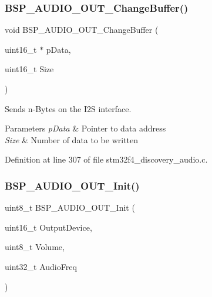 \subsubsection{\texorpdfstring{B\+S\+P\+\_\+\+A\+U\+D\+I\+O\+\_\+\+O\+U\+T\+\_\+\+Change\+Buffer()}{BSP\_AUDIO\_OUT\_ChangeBuffer()}}
{\footnotesize\ttfamily void B\+S\+P\+\_\+\+A\+U\+D\+I\+O\+\_\+\+O\+U\+T\+\_\+\+Change\+Buffer (\begin{DoxyParamCaption}\item[{uint16\+\_\+t $\ast$}]{p\+Data,  }\item[{uint16\+\_\+t}]{Size }\end{DoxyParamCaption})}



Sends n-\/\+Bytes on the I2S interface. 


\begin{DoxyParams}{Parameters}
{\em p\+Data} & Pointer to data address \\
\hline
{\em Size} & Number of data to be written \\
\hline
\end{DoxyParams}


Definition at line 307 of file stm32f4\+\_\+discovery\+\_\+audio.\+c.

\mbox{\label{group___s_t_m32_f4___d_i_s_c_o_v_e_r_y___a_u_d_i_o___o_u_t___exported___functions_gae713c698a93ff492424c6a8363f53bcc}} 
\subsubsection{\texorpdfstring{B\+S\+P\+\_\+\+A\+U\+D\+I\+O\+\_\+\+O\+U\+T\+\_\+\+Init()}{BSP\_AUDIO\_OUT\_Init()}}
{\footnotesize\ttfamily uint8\+\_\+t B\+S\+P\+\_\+\+A\+U\+D\+I\+O\+\_\+\+O\+U\+T\+\_\+\+Init (\begin{DoxyParamCaption}\item[{uint16\+\_\+t}]{Output\+Device,  }\item[{uint8\+\_\+t}]{Volume,  }\item[{uint32\+\_\+t}]{Audio\+Freq }\end{DoxyParamCaption})}



